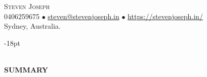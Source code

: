 \documentclass[12pt]{article}
\newcommand{\lineunder}{\vspace*{-10pt} \\ \hspace*{-18pt} \hrulefill \vspace{2pt}\\}
\newcommand{\header}[1]{{\hspace*{-15pt}\vspace*{-0pt}\\ \uppercase{\textbf {#1}}}  \lineunder}
\newcommand{\contact}[4]{
\vspace*{-19pt}
\begin{flushleft}
{\hspace*{-15pt} \Huge \scshape \scshape {#1}}\\
#2\\
#3
\newline
\end{flushleft}
}
\begin{document}
\contact{Steven Joseph}
{0406259675  $\bullet$ \href{mailto:steven@stevenjoseph.in}{steven@stevenjoseph.in} $\bullet$  \href{https://stevenjoseph.in/}{https://stevenjoseph.in/}}
{Sydney, Australia.}

\vspace{-18pt}


\header{Summary}




\end{document}
